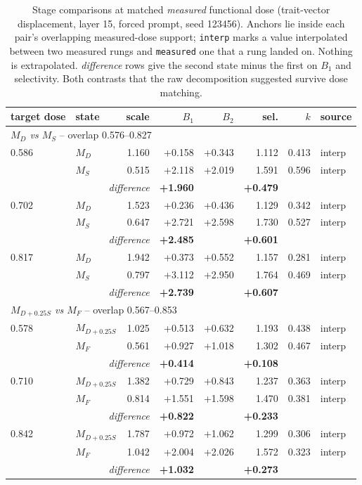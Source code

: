 \begin{table}[h]
\centering
\small
\begin{tabular}{llrrrrrl}
\toprule
target dose & state & scale & $B_1$ & $B_2$ & sel. & $k$ & source \\
\midrule
\multicolumn{8}{l}{\emph{$M_D$ vs $M_S$} -- overlap 0.576--0.827} \\
\midrule
0.586 & $M_D$ & 1.160 & +0.158 & +0.343 & 1.112 & 0.413 & interp \\
 & $M_S$ & 0.515 & +2.118 & +2.019 & 1.591 & 0.596 & interp \\
& \multicolumn{2}{r}{\emph{difference}} & \textbf{+1.960} & & \textbf{+0.479} & & \\
0.702 & $M_D$ & 1.523 & +0.236 & +0.436 & 1.129 & 0.342 & interp \\
 & $M_S$ & 0.647 & +2.721 & +2.598 & 1.730 & 0.527 & interp \\
& \multicolumn{2}{r}{\emph{difference}} & \textbf{+2.485} & & \textbf{+0.601} & & \\
0.817 & $M_D$ & 1.942 & +0.373 & +0.552 & 1.157 & 0.281 & interp \\
 & $M_S$ & 0.797 & +3.112 & +2.950 & 1.764 & 0.469 & interp \\
& \multicolumn{2}{r}{\emph{difference}} & \textbf{+2.739} & & \textbf{+0.607} & & \\
\midrule
\multicolumn{8}{l}{\emph{$M_{D+0.25S}$ vs $M_F$} -- overlap 0.567--0.853} \\
\midrule
0.578 & $M_{D+0.25S}$ & 1.025 & +0.513 & +0.632 & 1.193 & 0.438 & interp \\
 & $M_F$ & 0.561 & +0.927 & +1.018 & 1.302 & 0.467 & interp \\
& \multicolumn{2}{r}{\emph{difference}} & \textbf{+0.414} & & \textbf{+0.108} & & \\
0.710 & $M_{D+0.25S}$ & 1.382 & +0.729 & +0.843 & 1.237 & 0.363 & interp \\
 & $M_F$ & 0.814 & +1.551 & +1.598 & 1.470 & 0.381 & interp \\
& \multicolumn{2}{r}{\emph{difference}} & \textbf{+0.822} & & \textbf{+0.233} & & \\
0.842 & $M_{D+0.25S}$ & 1.787 & +0.972 & +1.062 & 1.299 & 0.306 & interp \\
 & $M_F$ & 1.042 & +2.004 & +2.026 & 1.572 & 0.323 & interp \\
& \multicolumn{2}{r}{\emph{difference}} & \textbf{+1.032} & & \textbf{+0.273} & & \\
\bottomrule
\end{tabular}
\caption{Stage comparisons at matched \emph{measured} functional dose (trait-vector displacement, layer 15, forced prompt, seed 123456). Anchors lie inside each pair's overlapping measured-dose support; \texttt{interp} marks a value interpolated between two measured rungs and \texttt{measured} one that a rung landed on. Nothing is extrapolated. \emph{difference} rows give the second state minus the first on $B_1$ and selectivity. Both contrasts that the raw decomposition suggested survive dose matching.}
\label{tab:oct-matched-dose}
\end{table}
